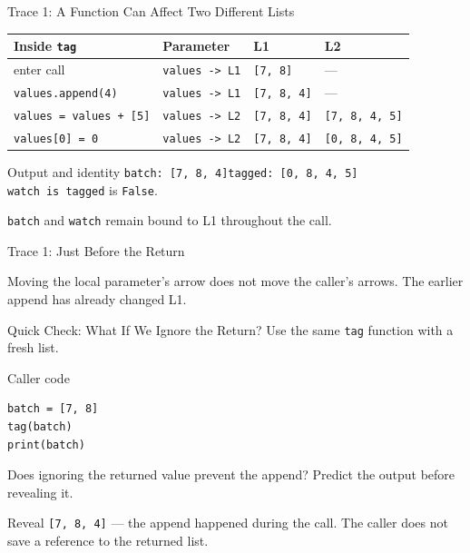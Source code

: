 \documentclass[aspectratio=169,10pt]{beamer}
\begin{document}
\begin{frame}{Trace 1: A Function Can Affect Two Different Lists}
  \begin{center}
    \small
    \renewcommand{\arraystretch}{1.35}
    \begin{tabular}{l|l|l|l}
      \textbf{Inside \texttt{tag}} & \textbf{Parameter} & \textbf{L1} & \textbf{L2} \\\hline
      enter call & \texttt{values -> L1} & \texttt{[7, 8]} & --- \\
      \texttt{values.append(4)} & \texttt{values -> L1} & \texttt{[7, 8, 4]} & --- \\
      \texttt{values = values + [5]} & \texttt{values -> L2} & \texttt{[7, 8, 4]} & \texttt{[7, 8, 4, 5]} \\
      \texttt{values[0] = 0} & \texttt{values -> L2} & \texttt{[7, 8, 4]} & \texttt{[0, 8, 4, 5]}
    \end{tabular}
  \end{center}
  \begin{block}{Output and identity}
    \texttt{batch: [7, 8, 4]}\qquad \texttt{tagged: [0, 8, 4, 5]}\\
    \texttt{watch is tagged} is \texttt{False}.
  \end{block}
  \texttt{batch} and \texttt{watch} remain bound to L1 throughout the call.
\end{frame}

\begin{frame}{Trace 1: Just Before the Return}
  \begin{center}
    \resizebox{0.90\linewidth}{!}{\parameterdiagram}
  \end{center}
  \begin{keyidea}
    Moving the local parameter's arrow does not move the caller's arrows. The earlier append has already changed L1.
  \end{keyidea}
\end{frame}

\begin{frame}[fragile]{Quick Check: What If We Ignore the Return?}
  Use the same \texttt{tag} function with a fresh list.
  \begin{block}{Caller code}
\begin{verbatim}
batch = [7, 8]
tag(batch)
print(batch)
\end{verbatim}
  \end{block}
  \begin{activity}
    Does ignoring the returned value prevent the append? Predict the output before revealing it.
  \end{activity}
  \pause
  \begin{block}{Reveal}
    \texttt{[7, 8, 4]} --- the append happened during the call. The caller does not save a reference to the returned list.
  \end{block}
\end{frame}
\end{document}
